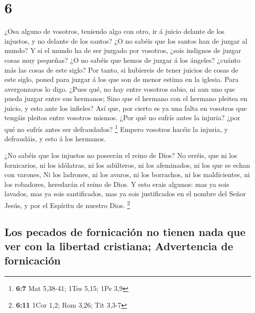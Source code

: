 \hypertarget{section-5}{%
\section{6}\label{section-5}}

 ¿Osa alguno de vosotros, teniendo algo con otro, ir á
juicio delante de los injustos, y no delante de los santos?
 ¿O no sabéis que los santos han de juzgar al mundo? Y si
el mundo ha de ser juzgado por vosotros, ¿sois indignos de juzgar cosas
muy pequeñas?  ¿O no sabéis que hemos de juzgar á los
ángeles? ¿cuánto más las cosas de este siglo?  Por tanto,
si hubiereis de tener juicios de cosas de este siglo, poned para juzgar
á los que son de menor estima en la iglesia.  Para
avergonzaros lo digo. ¿Pues qué, no hay entre vosotros sabio, ni aun uno
que pueda juzgar entre sus hermanos;  Sino que el hermano
con el hermano pleitea en juicio, y esto ante los infieles?
 Así que, por cierto es ya una falta en vosotros que
tengáis pleitos entre vosotros mismos. ¿Por qué no sufrís antes la
injuria? ¿por qué no sufrís antes ser defraudados? \footnote{\textbf{6:7}
  Mat 5,38-41; 1Tes 5,15; 1Pe 3,9}  Empero vosotros hacéis
la injuria, y defraudáis, y esto á los hermanos.

 ¿No sabéis que los injustos no poseerán el reino de Dios?
No erréis, que ni los fornicarios, ni los idólatras, ni los adúlteros,
ni los afeminados, ni los que se echan con varones,  Ni
los ladrones, ni los avaros, ni los borrachos, ni los maldicientes, ni
los robadores, heredarán el reino de Dios.  Y esto erais
algunos: mas ya sois lavados, mas ya sois santificados, mas ya sois
justificados en el nombre del Señor Jesús, y por el Espíritu de nuestro
Dios. \footnote{\textbf{6:11} 1Cor 1,2; Rom 3,26; Tit 3,3-7}

\hypertarget{los-pecados-de-fornicaciuxf3n-no-tienen-nada-que-ver-con-la-libertad-cristiana-advertencia-de-fornicaciuxf3n}{%
\subsection{Los pecados de fornicación no tienen nada que ver con la
libertad cristiana; Advertencia de
fornicación}\label{los-pecados-de-fornicaciuxf3n-no-tienen-nada-que-ver-con-la-libertad-cristiana-advertencia-de-fornicaciuxf3n}}

